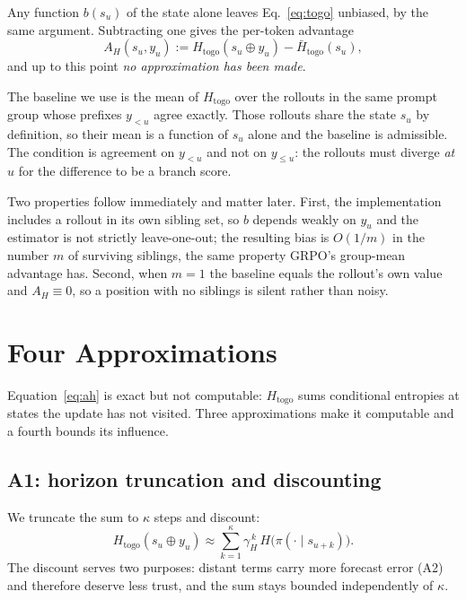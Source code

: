 \documentclass[11pt]{article}
\newcommand{\Htogo}{H_{\mathrm{togo}}}
\newcommand{\AH}{A_{H}}
\begin{document}
Any function $b(s_u)$ of the state alone leaves Eq.~\eqref{eq:togo} unbiased, by the
same argument. Subtracting one gives the per-token advantage
%
\begin{equation}
\AH(s_u, y_u) := \Htogo(s_u \oplus y_u) - \bar{H}_{\mathrm{togo}}(s_u),
\label{eq:ah}
\end{equation}
%
and up to this point \emph{no approximation has been made}.

The baseline we use is the mean of $\Htogo$ over the rollouts in the same prompt
group whose prefixes $y_{<u}$ agree exactly. Those rollouts share the state $s_u$ by
definition, so their mean is a function of $s_u$ alone and the baseline is
admissible. The condition is agreement on $y_{<u}$ and not on $y_{\le u}$: the
rollouts must diverge \emph{at} $u$ for the difference to be a branch score.

Two properties follow immediately and matter later. First, the implementation
includes a rollout in its own sibling set, so $b$ depends weakly on $y_u$ and the
estimator is not strictly leave-one-out; the resulting bias is $O(1/m)$ in the
number $m$ of surviving siblings, the same property GRPO's group-mean advantage
has. Second, when $m = 1$ the baseline equals the rollout's own value and
$\AH \equiv 0$, so a position with no siblings is silent rather than noisy.

\section{Four Approximations}
\label{sec:approx}

Equation~\eqref{eq:ah} is exact but not computable: $\Htogo$ sums conditional
entropies at states the update has not visited. Three approximations make it
computable and a fourth bounds its influence.

\subsection{A1: horizon truncation and discounting}

We truncate the sum to $\kappa$ steps and discount:
%
\begin{equation}
\Htogo(s_u \oplus y_u) \approx
\sum_{k=1}^{\kappa} \gamma_H^{\,k}\, H\bigl(\pi(\cdot \mid s_{u+k})\bigr).
\label{eq:a1}
\end{equation}
%
The discount serves two purposes: distant terms carry more forecast error (A2) and
therefore deserve less trust, and the sum stays bounded independently of $\kappa$.
\end{document}
